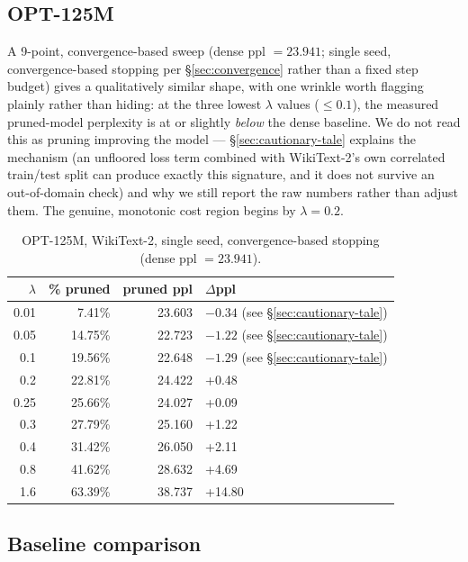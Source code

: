 \documentclass[11pt]{article}
\begin{document}
\subsection{OPT-125M}
\label{sec:opt125m}

A 9-point, convergence-based sweep (dense ppl $=23.941$; single seed,
convergence-based stopping per \S\ref{sec:convergence} rather than a fixed step budget) gives a
qualitatively similar shape, with one wrinkle worth flagging plainly rather
than hiding: at the three lowest $\lambda$ values ($\leq 0.1$), the measured
pruned-model perplexity is at or slightly \emph{below} the dense baseline. We do
not read this as pruning improving the model --- \S\ref{sec:cautionary-tale} explains the mechanism
(an unfloored loss term combined with WikiText-2's own correlated train/test
split can produce exactly this signature, and it does not survive an
out-of-domain check) and why we still report the raw numbers rather than
adjust them. The genuine, monotonic cost region begins by $\lambda = 0.2$.

\begin{table}[htbp]
\centering
\caption{OPT-125M, WikiText-2, single seed, convergence-based stopping (dense ppl $=23.941$).}
\label{tab:opt125m}
\begin{tabular}{@{}rrrl@{}}
\toprule
$\lambda$ & \% pruned & pruned ppl & $\Delta$ppl \\
\midrule
0.01 & 7.41\%  & 23.603 & $-0.34$ (see \S\ref{sec:cautionary-tale}) \\
0.05 & 14.75\% & 22.723 & $-1.22$ (see \S\ref{sec:cautionary-tale}) \\
0.1  & 19.56\% & 22.648 & $-1.29$ (see \S\ref{sec:cautionary-tale}) \\
0.2  & 22.81\% & 24.422 & +0.48 \\
0.25 & 25.66\% & 24.027 & +0.09 \\
0.3  & 27.79\% & 25.160 & +1.22 \\
0.4  & 31.42\% & 26.050 & +2.11 \\
0.8  & 41.62\% & 28.632 & +4.69 \\
1.6  & 63.39\% & 38.737 & +14.80 \\
\bottomrule
\end{tabular}
\end{table}

\subsection{Baseline comparison}
\label{sec:baseline}
\end{document}
